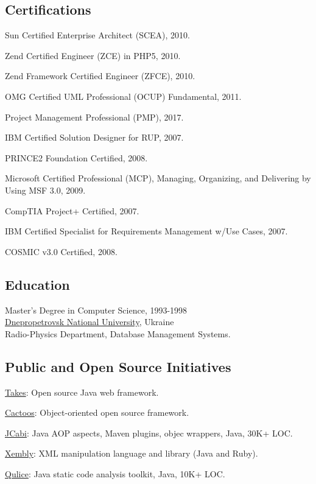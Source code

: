 \documentclass[12pt]{article}
\begin{document}
\subsection*{Certifications}

Sun Certified Enterprise Architect (SCEA), 2010.

Zend Certified Engineer (ZCE) in PHP5, 2010.

Zend Framework Certified Engineer (ZFCE), 2010.

OMG Certified UML Professional (OCUP) Fundamental, 2011.

Project Management Professional (PMP), 2017.

IBM Certified Solution Designer for RUP, 2007.

PRINCE2 Foundation Certified, 2008.

Microsoft Certified Professional (MCP), Managing, Organizing, and Delivering by Using MSF 3.0, 2009.

CompTIA Project+ Certified, 2007.

IBM Certified Specialist for Requirements Management w/Use Cases, 2007.

COSMIC v3.0 Certified, 2008.

\subsection*{Education}

Master's Degree in Computer Science, 1993-1998\\
\href{http://dnu.dp.ua/}{Dnepropetrovsk National University}, Ukraine\\
Radio-Physics Department, Database Management Systems.

\subsection*{Public and Open Source Initiatives}

\href{http://www.takes.org}{Takes}: Open source Java web framework.

\href{http://www.cactoos.org}{Cactoos}: Object-oriented open source framework.

\href{http://www.jcabi.com}{JCabi}: Java AOP aspects, Maven plugins, objec wrappers, Java, 30K+ LOC.

\href{http://www.xembly.org}{Xembly}: XML manipulation language and library (Java and Ruby).

\href{http://www.qulice.com}{Qulice}: Java static code analysis toolkit, Java, 10K+ LOC.
\end{document}
